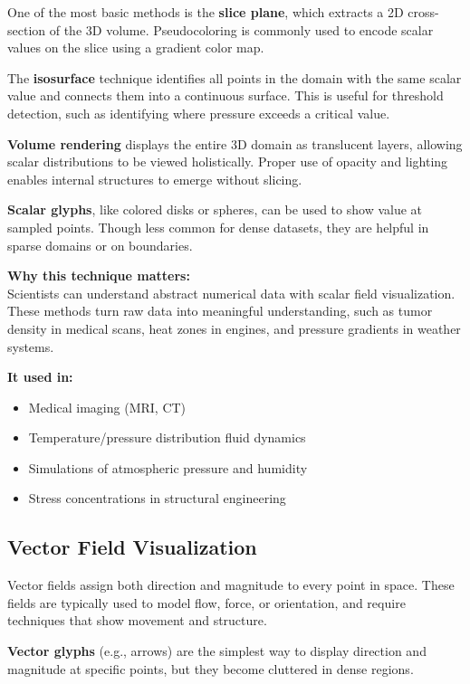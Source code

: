 \documentclass[11pt]{article}
\begin{document}
	One of the most basic methods is the \textbf{slice plane}, which extracts a 2D cross-section of the 3D volume. Pseudocoloring is commonly used to encode scalar values on the slice using a gradient color map.
	
	The \textbf{isosurface} technique identifies all points in the domain with the same scalar value and connects them into a continuous surface. This is useful for threshold detection, such as identifying where pressure exceeds a critical value.
	
	\textbf{Volume rendering} displays the entire 3D domain as translucent layers, allowing scalar distributions to be viewed holistically. Proper use of opacity and lighting enables internal structures to emerge without slicing.
	
	\textbf{Scalar glyphs}, like colored disks or spheres, can be used to show value at sampled points. Though less common for dense datasets, they are helpful in sparse domains or on boundaries.
	
	
	\vspace{1em}
\noindent
\textbf{Why this technique matters:} \\
Scientists can understand abstract numerical data with scalar field visualization. These methods turn raw data into meaningful understanding, such as tumor density in medical scans, heat zones in engines, and pressure gradients in weather systems.

\vspace{0.5em}
\noindent
\textbf{It used in:}
\begin{itemize}
    \item Medical imaging (MRI, CT)
    \item Temperature/pressure distribution fluid dynamics
    \item Simulations of atmospheric pressure and humidity
    \item Stress concentrations in structural engineering
\end{itemize}

	\subsection{Vector Field Visualization}
	Vector fields assign both direction and magnitude to every point in space. These fields are typically used to model flow, force, or orientation, and require techniques that show movement and structure.
	
	\textbf{Vector glyphs} (e.g., arrows) are the simplest way to display direction and magnitude at specific points, but they become cluttered in dense regions.
	
\end{document}
